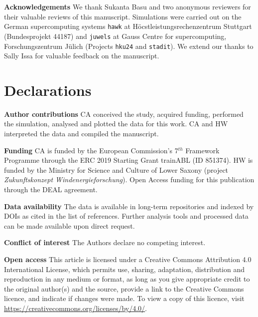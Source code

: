 \documentclass[smallcondensed,final]{svjour3}
\begin{document}
\vspace{1em}
\noindent\textbf{Acknowledgements} We thank Sukanta Basu and two anonymous reviewers for their valuable reviews of this manuscript. Simulations were carried out on the German supercomputing systems 
\texttt{hawk} at H\"ocstleistungsrechenzentrum Stuttgart (Bundesprojekt 44187) and \texttt{juwels} at Gauss Centre for supercomputing, 
For\-schungs\-zen\-trum J\"ulich (Projects \texttt{hku24} and \texttt{stadit}). 
We extend our thanks to Sally Issa for valuable feedback on the manuscript. 



\section*{Declarations} 

\noindent\textbf{Author contributions} CA conceived the study, acquired funding, performed the simulation, analysed and plotted the data for this work. CA and HW interpreted the data and compiled the manuscript. 
\vspace{1em} 

\noindent\textbf{Funding} CA is funded by the European Commission's 7$^{th}$ Framework Programme through 
the ERC 2019 Starting Grant trainABL (ID 851374). HW is funded by the Ministry for Science and Culture of 
Lower Saxony (project \emph{Zukunftskonzept Windenergieforschung}). Open Access funding for this publication through the DEAL agreement. 
\vspace{1em}

\noindent\textbf{Data availability} The data is available in long-term repositories and indexed by DOIs as cited in the list of references. Further analysis tools and processed data can be made available upon direct request. \vspace{1em}

\noindent\textbf{Conflict of interest} The Authors declare no competing interest.
\vspace{1em}

\noindent\textbf{Open access} This article is licensed under a Creative Commons Attribution 4.0 International License, which permits use, sharing, adaptation, distribution and reproduction in any medium or format, as long as you give appropriate credit to the original author(s) and the source, provide a link to the Creative Commons licence, and indicate if changes were made.  To view a copy of this licence, visit \href{http://creativecommons.org/licenses/by/4.0/}{https://creativecommons.org/licenses/by/4.0/}.
\end{document}
